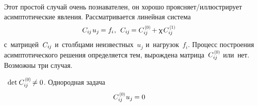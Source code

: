 

\begin{otherlanguage}{russian}

Этот простой случай очень познавателен, он хорошо проясняет/иллюстрирует асимптотические явления.
Рассматривается линейная система
\begin{equation}
C_{i\hspace{-0.1ex}j} \hspace{.2ex} u_{j} \hspace{-0.16ex} = f_{i} \hspace{.1ex} , \:\:
C_{i\hspace{-0.1ex}j} \hspace{-0.2ex} = C_{i\hspace{-0.1ex}j}^{\hspace{0.2ex}\scalebox{0.66}[0.66]{(0)}} \hspace{-0.2ex} + \smallparameter \hspace{.2ex} C_{i\hspace{-0.1ex}j}^{\hspace{0.2ex}\scalebox{0.66}[0.66]{(1)}}
\end{equation}
\noindent с~матрицей~$C_{i\hspace{-0.1ex}j}$ и~столбцами неизвестных~$u_j$ и~нагрузок~$f_i$.
Процесс построения асимптотического решения определяется тем, вырождена матрица~${C_{i\hspace{-0.1ex}j}^{\hspace{0.2ex}\scalebox{0.66}[0.66]{(0)}}}$ или~нет.
Возможны три случая.

\indent {}\, ${\operatorname{det} \hspace{.16ex} C_{i\hspace{-0.1ex}j}^{\hspace{0.2ex}\scalebox{0.66}[0.66]{(0)}} \hspace{-0.25ex} \neq 0}$.
Однородная задача
\vspace{-0.2em}\begin{equation}
C_{i\hspace{-0.1ex}j}^{\hspace{.2ex}\scalebox{0.66}[0.66]{(0)}} \hspace{.1ex} u_{j} \hspace{-0.16ex} = 0
\end{equation}


\end{otherlanguage}
